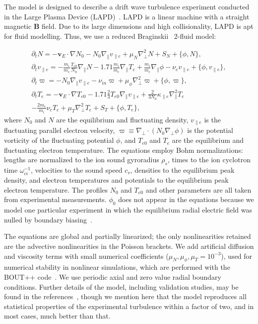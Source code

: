 \documentclass[showpacs,preprintnumbers,amsmath,amssymb,superscriptaddress,aip]{revtex4-1}
\def\beqar{\begin{eqnarray}}
\def\eeqar{\end{eqnarray}}
\newcommand{\pdt}{\partial_t}
\def\grad{\nabla}
\newcommand{\gradpar}{\grad_\parallel}
\newcommand{\gradperp}{\grad_\perp}
\newcommand{\vpe}{v_{\parallel e}}
\newcommand{\nue}{\nu_{e}}
\newcommand{\nuin}{\nu_{in}}
\newcommand{\kpe}{\kappa_{\parallel e}}
\newcommand{\fmie}{\frac{m_i}{m_e}}
\begin{document}
The model is designed to describe a drift wave turbulence experiment conducted in the Large Plasma Device (LAPD)~\cite{gekelman1991}. LAPD is a linear machine with a straight magnetic $\mathbf{B}$ field.
Due to its large dimensions and high collisionality, LAPD is apt for fluid modelling. Thus, we use a reduced Braginskii~\cite{Braginskii1965} 2-fluid model:

\beqar
\label{ni_eq}
\pdt N = - {\mathbf v_E} \cdot \grad N_0 - N_0 \gradpar \vpe + \mu_N \gradperp^2 N + S_N + \{\phi,N\}, \\
\label{ve_eq}
\pdt \vpe = - \fmie \frac{T_{e0}}{N_0} \gradpar N - 1.71 \fmie \gradpar T_e  + \fmie \gradpar \phi - \nue \vpe + \{\phi,\vpe \}, \\
\label{rho_eq}
\pdt \varpi = - N_0 \gradpar \vpe  - \nuin \varpi + \mu_\phi \gradperp^2 \varpi + \{\phi,\varpi \}, \\
\label{te_eq}
\pdt T_e = - {\mathbf v_E} \cdot \grad T_{e0} - 1.71 \frac{2}{3} T_{e0} \gradpar \vpe + \frac{2}{3 N_0} \kpe \gradpar^2 T_e  \nonumber \\
- \frac{2 m_e}{m_i} \nue T_e  + \mu_T \gradperp^2 T_e +  S_T + \{\phi,T_e\},
\eeqar
where $N_0$ and $N$ are the equilibrium and fluctuating density, $\vpe$ is the fluctuating parallel electron velocity, $\varpi \equiv \gradperp \cdot (N_0 \gradperp \phi)$ is the potential vorticity
of the fluctuating potential $\phi$, and $T_{e0}$ and $T_e$ are the equilibrium and fluctuating electron temperature. The equations employ Bohm normalizations: lengths are
normalized to the ion sound gyroradius $\rho_s$, times to the ion cyclotron time $\omega_{ci}^{-1}$, velocities to the sound speed $c_s$, densities to the equilibrium peak density, and electron
temperatures and potentials to the equilibrium peak electron temperature. The profiles $N_0$ and $T_{e0}$ and other parameters are all taken from experimental measurements. $\phi_0$ 
does not appear in the equations because we model one particular experiment in which the equilibrium radial electric field was nulled by boundary biasing~\cite{schaffner2012}. 

The equations are global and partially linearized; the only nonlinearities retained are the advective nonlinearities in the Poisson brackets. 
We add artificial diffusion and viscosity terms with small numerical coefficients ($\mu_N, \mu_\phi, \mu_T = 10^{-3}$), 
used for numerical stability in nonlinear simulations, which are performed with the BOUT++ code~\cite{dudson2009}. We use periodic axial and zero value radial 
boundary conditions. Further details of the model, including validation studies, may be found in the references~\cite{Popovich2010a,Popovich2010b,Umansky2011,friedman2012b,friedman2013},
though we mention here that the model reproduces all statistical properties of the experimental turbulence within a factor of two, and in most cases, much better than that.
\end{document}
